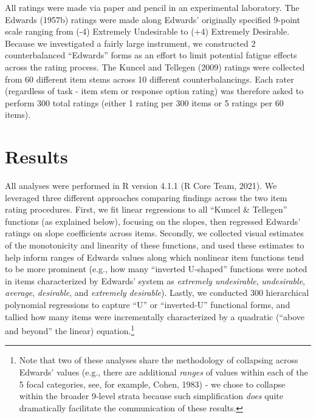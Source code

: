\documentclass[
  ,jou]{apa6}
\begin{document}
All ratings were made via paper and pencil in an experimental laboratory. The Edwards (1957b) ratings were made along Edwards' originally specified 9-point scale ranging from (-4) Extremely Undesirable to (+4) Extremely Desirable. Because we investigated a fairly large instrument, we constructed 2 counterbalanced ``Edwards'' forms as an effort to limit potential fatigue effects across the rating process. The Kuncel and Tellegen (2009) ratings were collected from 60 different item stems across 10 different counterbalancings. Each rater (regardless of task - item stem or response option rating) was therefore asked to perform 300 total ratings (either 1 rating per 300 items or 5 ratings per 60 items).

\hypertarget{results}{%
\section{Results}\label{results}}

All analyses were performed in R version 4.1.1 (R Core Team, 2021). We leveraged three different approaches comparing findings across the two item rating procedures. First, we fit linear regressions to all ``Kuncel \& Tellegen'' functions (as explained below), focusing on the slopes, then regressed Edwards' ratings on slope coefficients across items. Secondly, we collected visual estimates of the monotonicity and linearity of these functions, and used these estimates to help inform ranges of Edwards values along which nonlinear item functions tend to be more prominent (e.g., how many ``inverted U-shaped'' functions were noted in items characterized by Edwards' system as \emph{extremely undesirable}, \emph{undesirable}, \emph{average}, \emph{desirable}, and \emph{extremely desirable}). Lastly, we conducted 300 hierarchical polynomial regressions to capture ``U'' or ``inverted-U'' functional forms, and tallied how many items were incrementally characterized by a quadratic (``above and beyond'' the linear) equation.\footnote{Note that two of these analyses share the methodology of collapsing across Edwards' values (e.g., there are additional \emph{ranges} of values within each of the 5 focal categories, see, for example, Cohen, 1983) - we chose to collapse within the broader 9-level strata because such simplification \emph{does} quite dramatically facilitate the communication of these results.}
\end{document}
